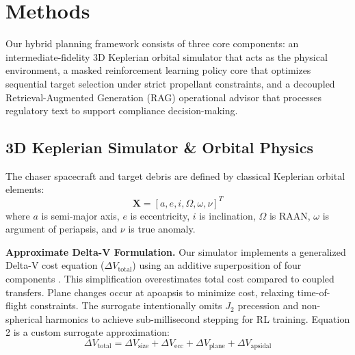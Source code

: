 \documentclass[10pt,conference,a4paper]{IEEEtran}
\begin{document}
\section{Methods}
Our hybrid planning framework consists of three core components: an intermediate-fidelity 3D Keplerian orbital simulator that acts as the physical environment, a masked reinforcement learning policy core that optimizes sequential target selection under strict propellant constraints, and a decoupled Retrieval-Augmented Generation (RAG) operational advisor that processes regulatory text to support compliance decision-making.

\subsection{3D Keplerian Simulator \& Orbital Physics}
The chaser spacecraft and target debris are defined by classical Keplerian orbital elements:
\begin{equation}
\mathbf{X} = [a, e, i, \Omega, \omega, \nu]^T
\end{equation}
where $a$ is semi-major axis, $e$ is eccentricity, $i$ is inclination, $\Omega$ is RAAN, $\omega$ is argument of periapsis, and $\nu$ is true anomaly.

\textbf{Approximate Delta-V Formulation.} Our simulator implements a generalized Delta-V cost equation ($\Delta V_{\text{total}}$) using an additive superposition of four components \cite{battin1999}. This simplification overestimates total cost compared to coupled transfers. Plane changes occur at apoapsis to minimize cost, relaxing time-of-flight constraints. The surrogate intentionally omits $J_2$ precession and non-spherical harmonics to achieve sub-millisecond stepping for RL training. Equation 2 is a custom surrogate approximation:
\begin{equation}
\Delta V_{\text{total}} = \Delta V_{\text{size}} + \Delta V_{\text{ecc}} + \Delta V_{\text{plane}} + \Delta V_{\text{apsidal}}
\end{equation}
\end{document}
